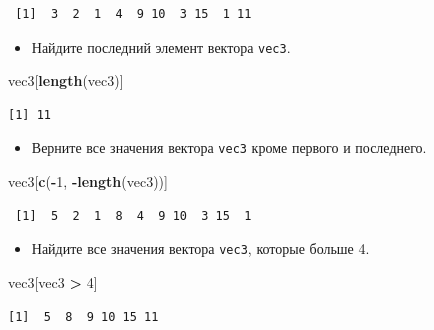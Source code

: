 \documentclass[
]{book}
\newenvironment{Shaded}{\begin{snugshade}}{\end{snugshade}}
\newcommand{\DecValTok}[1]{\textcolor[rgb]{0.00,0.00,0.81}{#1}}
\newcommand{\KeywordTok}[1]{\textcolor[rgb]{0.13,0.29,0.53}{\textbf{#1}}}
\newcommand{\NormalTok}[1]{#1}
\newcommand{\OperatorTok}[1]{\textcolor[rgb]{0.81,0.36,0.00}{\textbf{#1}}}
\newcommand{\StringTok}[1]{\textcolor[rgb]{0.31,0.60,0.02}{#1}}
\providecommand{\tightlist}{%
  \setlength{\itemsep}{0pt}\setlength{\parskip}{0pt}}
\begin{document}
\begin{verbatim}
 [1]  3  2  1  4  9 10  3 15  1 11
\end{verbatim}

\begin{itemize}
\tightlist
\item
  Найдите последний элемент вектора \texttt{vec3}.
\end{itemize}

\begin{Shaded}
\begin{Highlighting}[]
\NormalTok{vec3[}\KeywordTok{length}\NormalTok{(vec3)]}
\end{Highlighting}
\end{Shaded}

\begin{verbatim}
[1] 11
\end{verbatim}

\begin{itemize}
\tightlist
\item
  Верните все значения вектора \texttt{vec3} кроме первого и последнего.
\end{itemize}

\begin{Shaded}
\begin{Highlighting}[]
\NormalTok{vec3[}\KeywordTok{c}\NormalTok{(}\OperatorTok{-}\DecValTok{1}\NormalTok{, }\OperatorTok{-}\KeywordTok{length}\NormalTok{(vec3))]}
\end{Highlighting}
\end{Shaded}

\begin{verbatim}
 [1]  5  2  1  8  4  9 10  3 15  1
\end{verbatim}

\begin{itemize}
\tightlist
\item
  Найдите все значения вектора \texttt{vec3}, которые больше 4.
\end{itemize}

\begin{Shaded}
\begin{Highlighting}[]
\NormalTok{vec3[vec3 }\OperatorTok{>}\StringTok{ }\DecValTok{4}\NormalTok{]}
\end{Highlighting}
\end{Shaded}

\begin{verbatim}
[1]  5  8  9 10 15 11
\end{verbatim}
\end{document}
